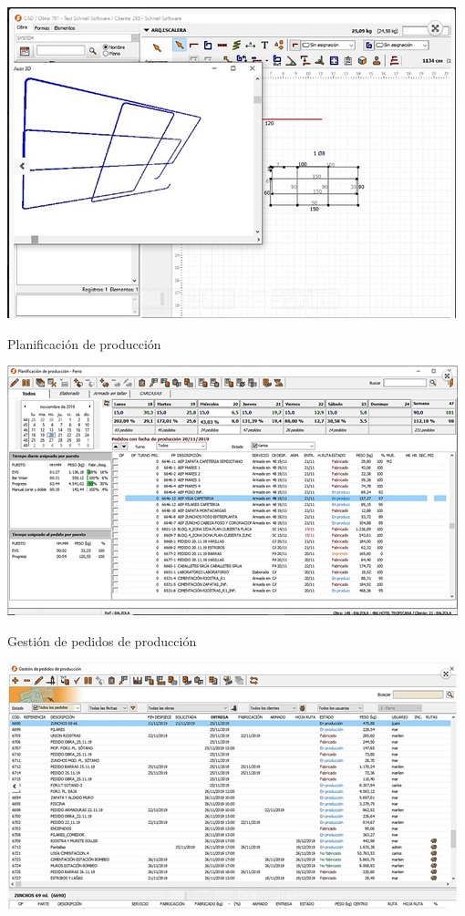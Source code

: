 \documentclass[10pt,a4paper]{article}
\begin{document}
\begin{enumerate}
\includegraphics[scale=1]{GRAPHICO PRO - Visor de elementos 3D.JPG}

\begin{center}
Planificación de producción
\end{center}

\includegraphics[scale=1]{GRAPHICO PRO - Planificacion de produccion.JPG}

\begin{center}
Gestión de pedidos de producción
\end{center}

\includegraphics[scale=1]{GRAPHICO PRO - Gestion de pedidos.JPG}


\end{enumerate}
\end{document}
